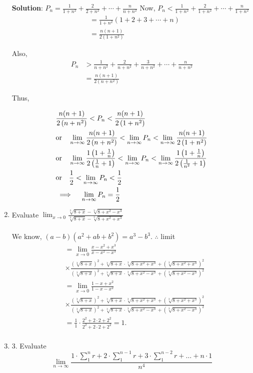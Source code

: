 \begin{enumerate}
\textbf{Solution}: $P_n=\frac{1}{1+n^2}+\frac{2}{2+n^2}+\cdots+\frac{n}{n+n^2}$
Now, $P_n<\frac{1}{1+n^2}+\frac{2}{1+n^2}+\cdots+\frac{n}{1+n^2}$
$$
\begin{aligned}
& =\frac{1}{1+n^2}(1+2+3+\cdots+n) \\
& =\frac{n(n+1)}{2\left(1+n^2\right)}
\end{aligned}
$$

Also,
$$
\begin{aligned}
P_n & >\frac{1}{n+n^2}+\frac{2}{n+n^2}+\frac{3}{n+n^2}+\cdots+\frac{n}{n+n^2} \\
& =\frac{n(n+1)}{2\left(n+n^2\right)}
\end{aligned}
$$

Thus, 

\begin{align}
    & \frac{n(n+1)}{2\left(n+n^2\right)}<P_n<\frac{n(n+1)}{2\left(1+n^2\right)} \notag \\
& \text{or} \quad \lim _{n \rightarrow \infty} \frac{n(n+1)}{2\left(n+n^2\right)}<\lim _{n \rightarrow \infty} P_n<\lim _{n \rightarrow \infty} \frac{n(n+1)}{2\left(1+n^2\right)} \notag \\
& \text{or} \quad \lim _{n \rightarrow \infty} \frac{1\left(1+\frac{1}{n}\right)}{2\left(\frac{1}{n}+1\right)}<\lim _{n \rightarrow \infty} P_n<\lim _{n \rightarrow \infty} \frac{1\left(1+\frac{1}{n}\right)}{2\left(\frac{1}{n^2}+1\right)} \notag \\
& \text{or} \quad \frac{1}{2}<\lim _{n \rightarrow \infty} P_n<\frac{1}{2} \notag \\
& \implies \quad \lim _{n \rightarrow \infty} P_n=\frac{1}{2} \notag 
\end{align}

\item Evaluate $\lim _{x \rightarrow 0} \frac{\sqrt[3]{8+x}-\sqrt[3]{8+x^2-x^3}}{\sqrt[3]{8+x}-\sqrt[3]{8+x^2+x^3}}$\\\\

We know, $(a-b)\left(a^2+a b+b^2\right)=a^3-b^3$.
$\therefore$ limit
$$
\begin{aligned}
& =\lim _{x \rightarrow 0} \frac{x-x^2+x^3}{x-x^2-x^3} \\
& \times \frac{(\sqrt[3]{8+x})^2+\sqrt[3]{8+x} \cdot \sqrt[3]{8+x^2+x^3}+\left(\sqrt[3]{8+x^2+x^3}\right)^2}{(\sqrt[3]{8+x})^2+\sqrt[3]{8+x} \cdot \sqrt[3]{8+x^2-x^3}+\left(\sqrt[3]{8+x^2-x^3}\right)^2} \\
& =\lim _{x \rightarrow 0} \frac{1-x+x^2}{1-x-x^2} \\
& \times \frac{(\sqrt[3]{8+x})^2+\sqrt[3]{8+x} \cdot \sqrt[3]{8+x^2+x^3}+\left(\sqrt[3]{8+x^2+x^3}\right)^2}{(\sqrt[3]{8+x})^2+\sqrt[3]{8+x} \cdot \sqrt[3]{8+x^2-x^3}+\left(\sqrt[3]{8+x^2-x^3}\right)^2} \\
& =\frac{1}{1} \cdot \frac{2^2+2 \cdot 2+2^2}{2^2+2 \cdot 2+2^2}=1 . \\
&
\end{aligned}
$$
\newpage
\item 3. Evaluate
$$
\lim _{n \rightarrow \infty} \frac{1 \cdot \sum_1^n r+2 \cdot \sum_1^{n-1} r+3 \cdot \sum_1^{n-2} r+\ldots+n \cdot 1}{n^4}
$$\\\\


\end{enumerate}
